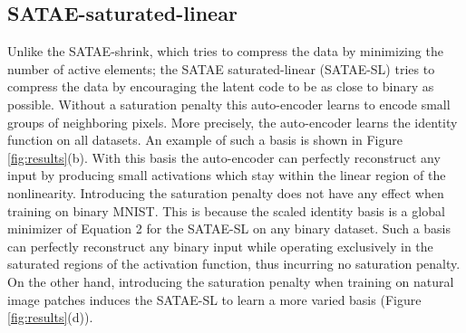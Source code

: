\documentclass{article} %
\begin{document}
\subsection{SATAE-saturated-linear} 
Unlike the SATAE-shrink, which tries to compress the data by minimizing the number of active elements; the SATAE saturated-linear (SATAE-SL) tries to compress the data by encouraging the latent code to be as close to binary as possible. Without a saturation penalty this auto-encoder learns to encode small groups of neighboring pixels. More precisely, the auto-encoder learns the identity function on all datasets. An example of such a basis is shown in Figure \ref{fig:results}(b). With this basis the auto-encoder can perfectly reconstruct any input by producing small activations which stay within the linear region of the nonlinearity. Introducing the saturation penalty does not have any effect when training on binary MNIST. This is because the scaled identity basis is a global minimizer of Equation 2 for the SATAE-SL on any binary dataset. Such a basis can perfectly reconstruct any binary input while operating exclusively in the saturated regions of the activation function, thus incurring no saturation penalty. On the other hand, introducing the saturation penalty when training on natural image patches induces the SATAE-SL to learn a more varied basis (Figure \ref{fig:results}(d)). 
\end{document}
